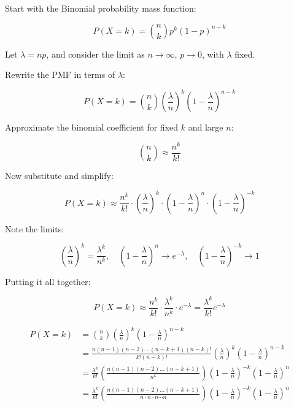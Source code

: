 \documentclass{tufte-handout}
\begin{document}
Start with the Binomial probability mass function:


\[
P(X = k) = \binom{n}{k} p^k (1 - p)^{n - k}
\]



Let \( \lambda = np \), and consider the limit as \( n \to \infty \), \( p \to 0 \), with \( \lambda \) fixed.

Rewrite the PMF in terms of \( \lambda \):


\[
P(X = k) = \binom{n}{k} \left( \frac{\lambda}{n} \right)^k \left( 1 - \frac{\lambda}{n} \right)^{n - k}
\]



Approximate the binomial coefficient for fixed \( k \) and large \( n \):


\[
\binom{n}{k} \approx \frac{n^k}{k!}
\]



Now substitute and simplify:


\[
P(X = k) \approx \frac{n^k}{k!} \cdot \left( \frac{\lambda}{n} \right)^k \cdot \left( 1 - \frac{\lambda}{n} \right)^n \cdot \left( 1 - \frac{\lambda}{n} \right)^{-k}
\]



Note the limits:


\[
\left( \frac{\lambda}{n} \right)^k = \frac{\lambda^k}{n^k}, \quad \left( 1 - \frac{\lambda}{n} \right)^n \to e^{-\lambda}, \quad \left( 1 - \frac{\lambda}{n} \right)^{-k} \to 1
\]



Putting it all together:


\[
P(X = k) \approx \frac{n^k}{k!} \cdot \frac{\lambda^k}{n^k} \cdot e^{-\lambda} = \frac{\lambda^k}{k!} e^{-\lambda}
\]


\begin{align*}
P(X = k) &= \binom{n}{k} \left( \frac{\lambda}{n} \right)^k \left( 1 - \frac{\lambda}{n} \right)^{n - k}\\
	     &= \frac{n (n-1)(n-2)\dots(n-k+1) (n-k)!}{k!(n-k)!}\left( \frac{\lambda}{n} \right)^k \left( 1 - \frac{\lambda}{n} \right)^{n - k}\\
	     &= \frac{\lambda^k}{k!}  \left( \frac{n (n-1)(n-2)\dots(n-k+1)}{n^k} \right)\left( 1 - \frac{\lambda}{n} \right)^{-k}\left( 1 - \frac{\lambda}{n} \right)^{n}\\
	     &= \frac{\lambda^k}{k!}  \left( \frac{n (n-1)(n-2)\dots(n-k+1)}{n \cdot n \cdot n \cdots  n } \right)\left( 1 - \frac{\lambda}{n} \right)^{-k}\left( 1 - \frac{\lambda}{n} \right)^{n}
\end{align*}
\end{document}
